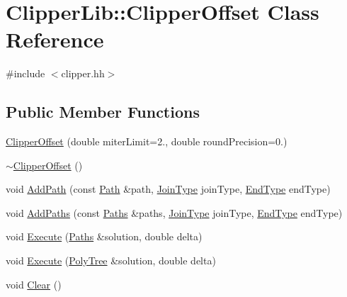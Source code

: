 \hypertarget{class_clipper_lib_1_1_clipper_offset}{}\section{Clipper\+Lib\+::Clipper\+Offset Class Reference}
\label{class_clipper_lib_1_1_clipper_offset}


{\ttfamily \#include $<$clipper.\+hh$>$}

\subsection*{Public Member Functions}
\begin{DoxyCompactItemize}
\item 
\mbox{\hyperlink{class_clipper_lib_1_1_clipper_offset_a45b4750989901db0c3865c374abdfcdc}{Clipper\+Offset}} (double miter\+Limit=2., double round\+Precision=0.)
\item 
\mbox{\hyperlink{class_clipper_lib_1_1_clipper_offset_a05b2d8d13e1148db74b681203a6ea76d}{$\sim$\+Clipper\+Offset}} ()
\item 
void \mbox{\hyperlink{class_clipper_lib_1_1_clipper_offset_a0cd68e3690072f510924a5b25291043b}{Add\+Path}} (const \mbox{\hyperlink{namespace_clipper_lib_af39c8fe00f278f18cc8142fef41242da}{Path}} \&path, \mbox{\hyperlink{namespace_clipper_lib_ab3880a3ca1b45df3ce93ac315a74c06e}{Join\+Type}} join\+Type, \mbox{\hyperlink{namespace_clipper_lib_abee78a365e96a6edf45e15f885568079}{End\+Type}} end\+Type)
\item 
void \mbox{\hyperlink{class_clipper_lib_1_1_clipper_offset_a18b35198f6370d76885af995ee2f16cb}{Add\+Paths}} (const \mbox{\hyperlink{namespace_clipper_lib_a4bab1d9e10805fa6f1fd3b78c56efcfe}{Paths}} \&paths, \mbox{\hyperlink{namespace_clipper_lib_ab3880a3ca1b45df3ce93ac315a74c06e}{Join\+Type}} join\+Type, \mbox{\hyperlink{namespace_clipper_lib_abee78a365e96a6edf45e15f885568079}{End\+Type}} end\+Type)
\item 
void \mbox{\hyperlink{class_clipper_lib_1_1_clipper_offset_ac591b25e483a52c99c3190a256ad4589}{Execute}} (\mbox{\hyperlink{namespace_clipper_lib_a4bab1d9e10805fa6f1fd3b78c56efcfe}{Paths}} \&solution, double delta)
\item 
void \mbox{\hyperlink{class_clipper_lib_1_1_clipper_offset_a3aaa9fcc20e503c967a23f1793536118}{Execute}} (\mbox{\hyperlink{class_clipper_lib_1_1_poly_tree}{Poly\+Tree}} \&solution, double delta)
\item 
void \mbox{\hyperlink{class_clipper_lib_1_1_clipper_offset_ab444433587b6a3f6c89655938d889c7d}{Clear}} ()
\end{DoxyCompactItemize}
